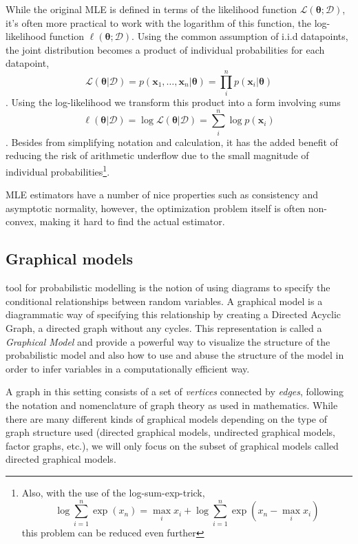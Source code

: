 While the original MLE is defined in terms of the likelihood function
$\mathcal{L}(\bm{\theta}; \mathcal{D})$, it's often more practical to work with
the logarithm of this function, the log-likelihood function $\ell(\bm{\theta} ;
\mathcal{D})$. Using the common assumption of i.i.d datapoints, the joint
distribution becomes a product of individual probabilities for each datapoint,
\begin{equation}
  \label{eq:likelihood}
  \mathcal{L}(\bm{\theta} | \mathcal{D}) = p(\bm{x}_1, \dots, \bm{x}_n | \bm{\theta}) = \prod_i^n p(\bm{x}_i | \bm{\theta})
\end{equation}.
Using the log-likelihood we transform this product into a form involving sums
\begin{equation}
  \label{eq:log-likelihood}
  \ell(\bm{\theta} | \mathcal{D}) = \log \mathcal{L}(\bm{\theta} | \mathcal{D}) = \sum_i^n \log p(\bm{x}_i)
\end{equation}.
Besides from simplifying notation and calculation, it has the added benefit of
reducing the risk of arithmetic underflow due to the small magnitude of
individual probabilities\footnote{Also, with the use of the log-sum-exp-trick,
  \begin{equation*}
    \log \sum_{i=1}^n \exp(x_n) = \max_i x_i + \log \sum_{i=1}^n \exp(x_n - \max_i x_i)
  \end{equation*}
  this problem can be reduced even further}.

MLE estimators have a number of nice properties such as consistency and
asymptotic normality, however, the optimization problem itself is often
non-convex, making it hard to find the actual estimator\cite{CaseBerg:01}.

\subsection{Graphical models}
tool for probabilistic modelling is the notion of using
diagrams to specify the conditional relationships between random variables. A
graphical model is a diagrammatic way of specifying this relationship by
creating a Directed Acyclic Graph, a directed graph without any cycles. This
representation is called a \textit{Graphical Model} and provide a powerful way
to visualize the structure of the probabilistic model and also how to use and
abuse the structure of the model in order to infer variables in a computationally efficient way.

A graph in this setting consists of a set of \textit{vertices} connected by
\textit{edges}, following the notation and nomenclature of graph theory as used
in mathematics. While there are many different kinds of graphical models
depending on the type of graph structure used (directed graphical models,
undirected graphical models, factor graphs, etc.), we will only focus on the
subset of graphical models called directed graphical models.


